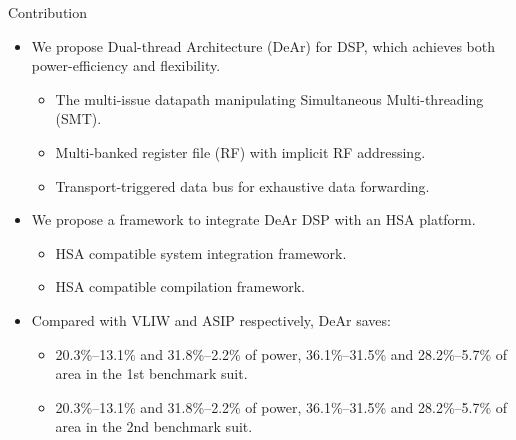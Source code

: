 \documentclass{beamer}
\begin{document}
\begin{CJK}{UTF8}{bkai}
    \begin{frame}{Contribution}
        \begin{itemize}
            \item {
                    We propose Dual-thread Architecture (DeAr) for DSP, which achieves both power-efficiency and flexibility.
                    \begin{itemize}
                        \item {
                                The multi-issue datapath manipulating Simultaneous Multi-threading (SMT).
                            }
                        \item {
                                Multi-banked register file (RF) with implicit RF addressing.
                            }
                        \item {
                                Transport-triggered data bus for exhaustive data forwarding.
                            }
                        \end{itemize}
                }
            \item {
                    We propose a framework to integrate DeAr DSP with an HSA platform.
                    \begin{itemize}
                        \item {
                                HSA compatible system integration framework.
                            }
                        \item {
                                HSA compatible compilation framework.
                            }
                        \end{itemize}
                }
            \item{
        Compared with VLIW and ASIP respectively, DeAr saves: 
                    \begin{itemize}
                        \item {
                            20.3\%--13.1\% and 31.8\%--2.2\% of power, 36.1\%--31.5\% and 28.2\%--5.7\% of area in the 1st benchmark suit.
                            }
                        \item {
                            20.3\%--13.1\% and 31.8\%--2.2\% of power, 36.1\%--31.5\% and 28.2\%--5.7\% of area in the 2nd benchmark suit.
                            }
                        \end{itemize}
                }
        \end{itemize}
    \end{frame}


\end{CJK}
\end{document}
